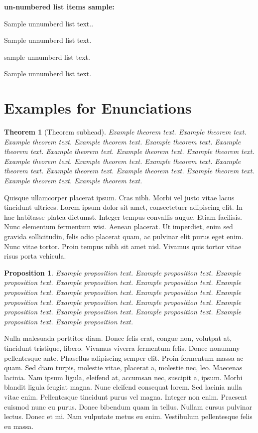\documentclass{wber}
\newtheorem{theorem}{Theorem}
\newtheorem{proposition}{Proposition}
\begin{document}
\noindent\textbf{un-numbered list items sample:}

\begin{unnumlist}
\item Sample unnumberd list text..
\item Sample unnumberd list text.
\item sample unnumberd list text. 
\item Sample unnumberd list text.
\end{unnumlist}

\section{Examples for Enunciations}\label{sec4}

\begin{theorem}[Theorem subhead]\label{thm1}
Example theorem text. Example theorem text. Example theorem text. Example theorem text. Example theorem text. Example theorem text. Example theorem text. Example theorem text. Example theorem text. Example theorem text. Example theorem text. Example theorem text. Example theorem text. Example theorem text. Example theorem text. Example theorem text. Example theorem text. Example theorem text.
\end{theorem}

Quisque ullamcorper placerat ipsum. Cras nibh. Morbi vel justo vitae lacus tincidunt ultrices. Lorem ipsum dolor sit
amet, consectetuer adipiscing elit. In hac habitasse platea dictumst. Integer tempus convallis augue. Etiam facilisis.
Nunc elementum fermentum wisi. Aenean placerat. Ut imperdiet, enim sed gravida sollicitudin, felis odio placerat
quam, ac pulvinar elit purus eget enim. Nunc vitae tortor. Proin tempus nibh sit amet nisl. Vivamus quis tortor
vitae risus porta vehicula.

\begin{proposition}
Example proposition text. Example proposition text. Example proposition text. Example proposition text. Example proposition text. Example proposition text. Example proposition text. Example proposition text. Example proposition text. Example proposition text. Example proposition text. Example proposition text. Example proposition text. Example proposition text. Example proposition text. Example proposition text. 
\end{proposition}

Nulla malesuada porttitor diam. Donec felis erat, congue non, volutpat at, tincidunt tristique, libero. Vivamus
viverra fermentum felis. Donec nonummy pellentesque ante. Phasellus adipiscing semper elit. Proin fermentum massa
ac quam. Sed diam turpis, molestie vitae, placerat a, molestie nec, leo. Maecenas lacinia. Nam ipsum ligula, eleifend
at, accumsan nec, suscipit a, ipsum. Morbi blandit ligula feugiat magna. Nunc eleifend consequat lorem. Sed lacinia
nulla vitae enim. Pellentesque tincidunt purus vel magna. Integer non enim. Praesent euismod nunc eu purus. Donec
bibendum quam in tellus. Nullam cursus pulvinar lectus. Donec et mi. Nam vulputate metus eu enim. Vestibulum
pellentesque felis eu massa.
\end{document}
